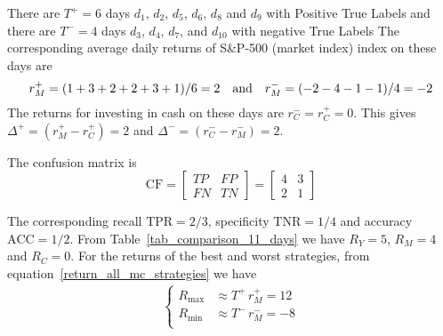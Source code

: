 \documentclass{article}
\begin{document}
There are $T^{+}=6$ days $d_{1}$, $d_{2}$, $d_{5}$, $d_{6}$, $d_{8}$ and $d_{9}$ with Positive True Labels
and there are $T^{-}=4$ days $d_{3}$, $d_{4}$, $d_{7}$, and $d_{10}$ with negative True Labels
The corresponding average daily returns of S{\&}P-500 (market index) index on these days
are 
\begin{equation*}
r_{M}^{+}=(1+3+2+2+3+1)/6= 2  \quad \hbox{and} 
\quad r_{M}^{-}=(-2-4-1-1)/4 =-2
\end{equation*}
The returns for investing in cash on these days are $r_{C}^{-}=r_{C}^{+}=0$.
This gives $\Delta^{+}=(r_{M}^{+}-r_{C}^{+}) =2$ and $\Delta^{-}=(r_{C}^{-}-r_{M}^{-})=2$.

The confusion matrix is
\begin{equation}
\text{CF}=\begin{bmatrix} TP & FP\\ FN & TN\end{bmatrix}=
\begin{bmatrix} 4 & 3 \\ 2 & 1 \end{bmatrix}
\label{confusion_y}
\end{equation}

\noindent
The corresponding recall $\text{TPR}=2/3$, specificity $\text{TNR}=1/4$ and
accuracy $\text{ACC}=1/2$. 
From Table~\ref{tab_comparison_11_days} we have $R_{Y}=5$, $R_{M}=4$ and $R_{C}=0$. For the returns of the best and worst strategies, from equation~\eqref{return_all_mc_strategies} we have
\begin{equation}
\begin{split}
\begin{cases}
      R_{\max} & \approx  T^{+}\, r_{M}^{+} =12 \\
    R_{\min} & \approx  T^{-}\, r_{M}^{-} =-8\\
    \end{cases}
    \label{return_y_example}
\end{split}
\end{equation}
\end{document}
